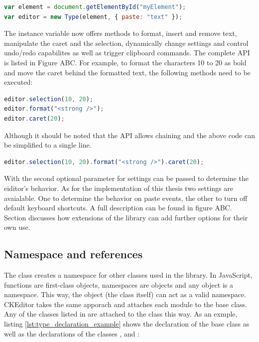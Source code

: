\begin{lstlisting}[language=JavaScript, caption=Type instantiation, label=lst:type_instantiation]
var element = document.getElementById("myElement");
var editor = new Type(element, { paste: "text" });
\end{lstlisting}

The  instance variable now offers methods to format, insert and remove text, manipulate the caret and the selection, dynamically change settings and control undo/redo capabilites as well as trigger clipboard commands. The complete API is listed in Figure ABC. For example, to format the characters 10 to 20 as bold and move the caret behind the formatted text, the following methods need to be executed:

\begin{lstlisting}[language=JavaScript, caption=Example commands to format text, label=lst:type_format_example]
editor.selection(10, 20);
editor.format("<strong />");
editor.caret(20);
\end{lstlisting}

\noindent Although it should be noted that the API allows chaining and the above code can be simplified to a single line.

\begin{lstlisting}[language=JavaScript, caption=Example chaining, label=lst:type_chaining_example]
editor.selection(10, 20).format("<strong />").caret(20);
\end{lstlisting}

With the second optional parameter for  settings can be passed to determine the eiditor's behavior. As for the implementation of this thesis two settings are avaialable. One to determine the behavior on paste events, the other to turn off default keyboard shortcuts. A full description can be found in figure ABC. Section  discusses how extensions of the library can add further options for their own use.

\subsection{Namespace and references} 
\label{subsec:namespace_and_refs}

The  class creates a namespace for other classes used in the library. In JavaScript, functions are first-class objects, namespaces are objects and any object is a namespace. This way, the   object (the class itself) can act as a valid namespace. CKEditor takes the same apporach and attaches each module to the  base class. Any of the classes listed in  are attached to the  class this way. As an exmple, listing \ref{lst:type_declaration_example} shows the declaration of the  base class as well as the declarations of the classes ,  and :

